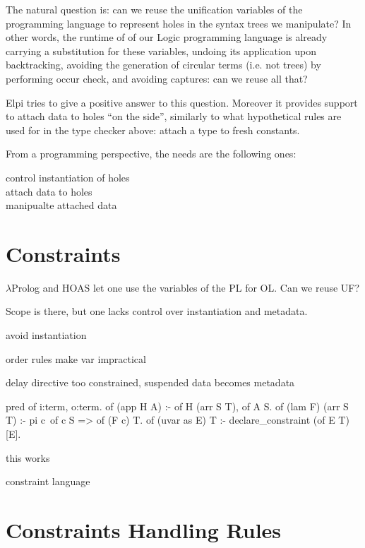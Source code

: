 \documentclass[a4paper, 11pt]{book}
\begin{document}
The natural question is: can we reuse the unification variables of
the programming language to represent holes in the syntax trees we manipulate?
In other words, the runtime of of our Logic programming language is already
carrying a substitution for these variables, undoing its application upon
backtracking, avoiding the generation of circular terms (i.e. not trees)
by performing occur check, and avoiding captures: can we reuse all that?

Elpi tries to give a positive answer to this question. Moreover it provides
support to attach data to holes ``on the side'', similarly to what
hypothetical rules are used for in the type checker above: attach a type
to fresh constants.

From a programming perspective, the needs are the following ones:

\begin{description}
  \item[control instantiation of holes]
  \item[attach data to holes] 
  \item[manipualte attached data] 
\end{description}


\section{Constraints}

$\lambda$Prolog and HOAS let one use the variables of the PL for OL.
Can we reuse UF?

Scope is there, but one lacks control over instantiation and metadata.


avoid instantiation

order rules make var impractical

delay directive too constrained, suspended data becomes metadata

\begin{elpicode}
pred of i:term, o:term.
of (app H A) :- of H (arr S T), of A S.
of (lam F) (arr S T) :- pi c\ of c S => of (F c) T.
of (uvar as E) T :- declare_constraint (of E T) [E].
\end{elpicode} 

this works


constraint language

\section{Constraints Handling Rules}
\end{document}
